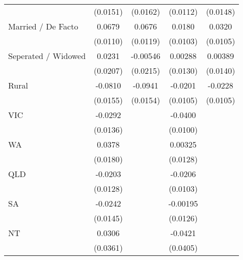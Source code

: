 {\begin{tabular}{l*{4}{c}}
                    &    (0.0151)         &    (0.0162)         &    (0.0112)         &    (0.0148)         \\
[1em]
Married / De Facto  &      0.0679\sym{***}&      0.0676\sym{***}&      0.0180         &      0.0320\sym{**} \\
                    &    (0.0110)         &    (0.0119)         &    (0.0103)         &    (0.0105)         \\
[1em]
Seperated / Widowed &      0.0231         &    -0.00546         &     0.00288         &     0.00389         \\
                    &    (0.0207)         &    (0.0215)         &    (0.0130)         &    (0.0140)         \\
[1em]
Rural               &     -0.0810\sym{***}&     -0.0941\sym{***}&     -0.0201         &     -0.0228\sym{*}  \\
                    &    (0.0155)         &    (0.0154)         &    (0.0105)         &    (0.0105)         \\
[1em]
VIC                 &     -0.0292\sym{*}  &                     &     -0.0400\sym{***}&                     \\
                    &    (0.0136)         &                     &    (0.0100)         &                     \\
[1em]
WA                  &      0.0378\sym{*}  &                     &     0.00325         &                     \\
                    &    (0.0180)         &                     &    (0.0128)         &                     \\
[1em]
QLD                 &     -0.0203         &                     &     -0.0206\sym{*}  &                     \\
                    &    (0.0128)         &                     &    (0.0103)         &                     \\
[1em]
SA                  &     -0.0242         &                     &    -0.00195         &                     \\
                    &    (0.0145)         &                     &    (0.0126)         &                     \\
[1em]
NT                  &      0.0306         &                     &     -0.0421         &                     \\
                    &    (0.0361)         &                     &    (0.0405)         &                     \\

\end{tabular}}
